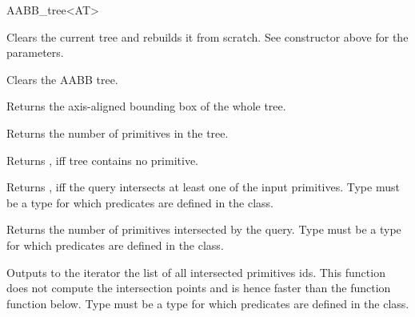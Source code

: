 \begin{ccRefClass}{AABB_tree<AT>}
\ccOperations

{Clears the current tree and rebuilds it from scratch. See constructor above for the parameters. }

{Clears the AABB tree. }

{Returns the axis-aligned bounding box of the whole tree. }

{Returns the number of primitives in the tree. }

{Returns , iff tree contains no primitive. }


{Returns , iff the query intersects at least one of the input primitives. Type  must be a type for which  predicates are defined in the  class.}
	
{Returns the number of primitives intersected by the query. Type  must be a type for which  predicates are defined in the  class.}


{Outputs to the iterator the list of all intersected primitives ids. This function does not compute the intersection points and is hence faster than the function  function below. Type  must be a type for which  predicates are defined in the  class.}


\end{ccRefClass}
